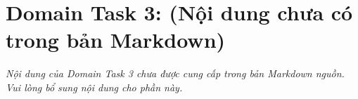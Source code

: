 \section{Domain Task 3: (Nội dung chưa có trong bản Markdown)}


\textit{Nội dung của Domain Task 3 chưa được cung cấp trong bản Markdown nguồn.
Vui lòng bổ sung nội dung cho phần này.}
